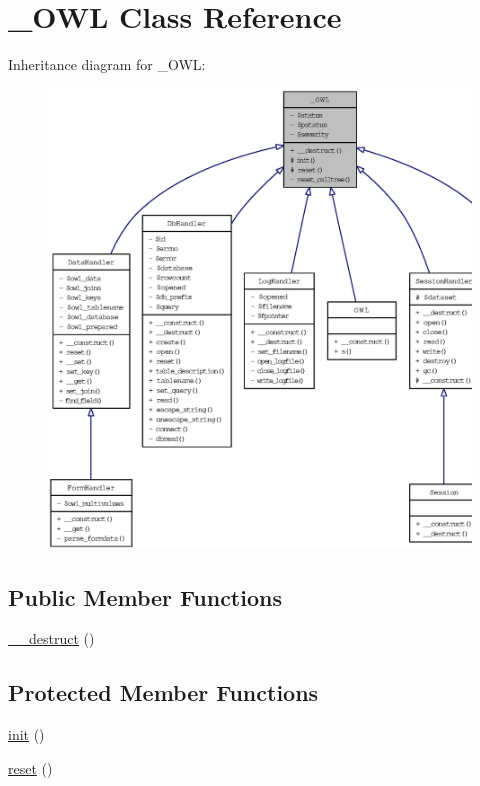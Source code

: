 \hypertarget{class__OWL}{
\section{\_\-OWL Class Reference}
\label{class__OWL}
}
Inheritance diagram for \_\-OWL:\nopagebreak
\begin{figure}[H]
\begin{center}
\leavevmode
\includegraphics[width=400pt]{class__OWL__inherit__graph}
\end{center}
\end{figure}
\subsection*{Public Member Functions}
\begin{CompactItemize}
\item 
\hyperlink{class__OWL_44fd2222476a3109286cc82d92b6bbcc}{\_\-\_\-destruct} ()
\end{CompactItemize}
\subsection*{Protected Member Functions}
\begin{CompactItemize}
\item 
\hyperlink{class__OWL_e0ef3ded56e8a6b34b6461e5a721cd3e}{init} ()
\item 
\hyperlink{class__OWL_2f2a042bcf31965194c03033df0edc9b}{reset} ()
\end{CompactItemize}
